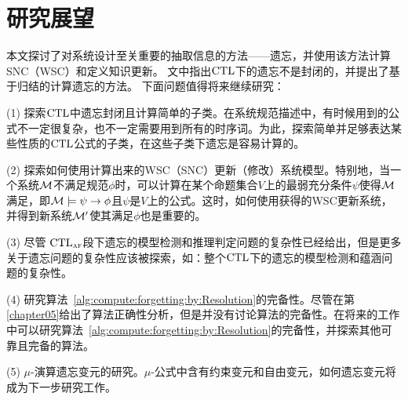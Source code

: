 \section{研究展望}
本文探讨了对系统设计至关重要的抽取信息的方法——遗忘，并使用该方法计算SNC（WSC）和定义知识更新。
文中指出$\textrm{CTL}$下的遗忘不是封闭的，并提出了基于归结的计算遗忘的方法。
下面问题值得将来继续研究：

(1) 探索$\textrm{CTL}$中遗忘封闭且计算简单的子类。在系统规范描述中，有时候用到的公式不一定很复杂，也不一定需要用到所有的时序词。为此，探索简单并足够表达某些性质的$\textrm{CTL}$公式的子类，在这些子类下遗忘是容易计算的。

(2) 探索如何使用计算出来的WSC（SNC）更新（修改）系统模型。特别地，当一个系统$\cal M$不满足规范$\phi$时，可以计算在某个命题集合$V$上的最弱充分条件$\psi$使得${\cal M}$满足，即${\cal M}\models\psi\rightarrow \phi$且$\psi$是$V$上的公式。这时，如何使用获得的WSC更新系统，并得到新系统${\cal M}'$使其满足$\phi$也是重要的。


(3) 尽管 $\textrm{CTL}_{\textsc{a}\textsc{f}}$段下遗忘的模型检测和推理判定问题的复杂性已经给出，但是更多关于遗忘问题的复杂性应该被探索，如：整个$\textrm{CTL}$下的遗忘的模型检测和蕴涵问题的复杂性。

(4) 研究算法~\ref{alg:compute:forgetting:by:Resolution}的完备性。尽管在第\ref{chapter05}给出了算法正确性分析，但是并没有讨论算法的完备性。在将来的工作中可以研究算法~\ref{alg:compute:forgetting:by:Resolution}的完备性，并探索其他可靠且完备的算法。

(5) $\mu$-演算遗忘变元的研究。$\mu$-公式中含有约束变元和自由变元，如何遗忘变元将成为下一步研究工作。